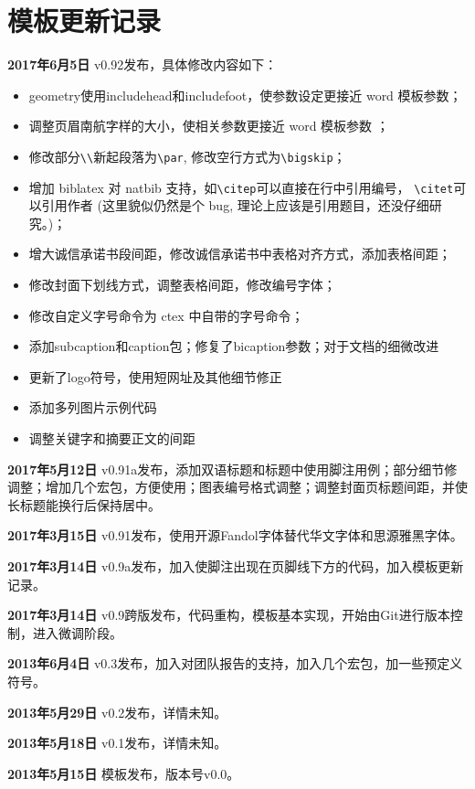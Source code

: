\chapter{模板更新记录}
\label{chap:updatelog}
\textbf{2017年6月5日} v0.92发布，具体修改内容如下：
\begin{itemize}
  \item geometry使用includehead和includefoot，使参数设定更接近 word 模板参数；
  \item 调整页眉南航字样的大小，使相关参数更接近 word 模板参数 ；
  \item 修改部分\verb!\\!新起段落为\verb!\par!, 修改空行方式为\verb!\bigskip!；
  \item 增加 biblatex 对 natbib 支持，如\verb!\citep!可以直接在行中引用编号， \verb!\citet!可以引用作者 (这里貌似仍然是个 bug, 理论上应该是引用题目，还没仔细研究。)；
  \item 增大诚信承诺书段间距，修改诚信承诺书中表格对齐方式，添加表格间距；
  \item 修改封面下划线方式，调整表格间距，修改编号字体；
  \item 修改自定义字号命令为 ctex 中自带的字号命令；
  \item	添加subcaption和caption包；修复了bicaption参数；对于文档的细微改进
  \item 更新了logo符号，使用短网址及其他细节修正
  \item 添加多列图片示例代码
  \item 调整关键字和摘要正文的间距
\end{itemize}

\textbf{2017年5月12日} v0.91a发布，添加双语标题和标题中使用脚注用例；部分细节修调整；增加几个宏包，方便使用；图表编号格式调整；调整封面页标题间距，并使长标题能换行后保持居中。

\textbf{2017年3月15日} v0.91发布，使用开源Fandol字体替代华文字体和思源雅黑字体。

\textbf{2017年3月14日} v0.9a发布，加入使脚注出现在页脚线下方的代码，加入模板更新记录。

\textbf{2017年3月14日} v0.9跨版发布，代码重构，模板基本实现，开始由Git进行版本控制，进入微调阶段。

\textbf{2013年6月4日} v0.3发布，加入对团队报告的支持，加入几个宏包，加一些预定义符号。

\textbf{2013年5月29日} v0.2发布，详情未知。

\textbf{2013年5月18日} v0.1发布，详情未知。

\textbf{2013年5月15日} 模板发布，版本号v0.0。
